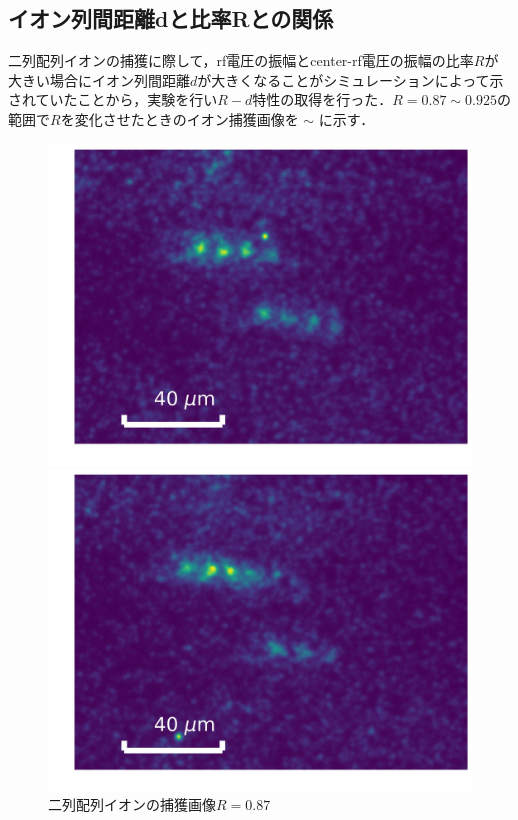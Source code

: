 \subsection{イオン列間距離dと比率Rとの関係}\label{quantity_3}
二列配列イオンの捕獲に際して，rf電圧の振幅とcenter-rf電圧の振幅の比率$R$が大きい場合にイオン列間距離$d$が大きくなることがシミュレーションによって示されていたことから，実験を行い$R-d$特性の取得を行った．$R = 0.87 \sim 0.925$の範囲で$R$を変化させたときのイオン捕獲画像を $\sim$ に示す．
\begin{figure}[h]
	\begin{minipage}{0.33\linewidth}
		\begin{center}
			\includegraphics[width = 0.8\columnwidth]{./results/figure/2D_087.jpg}
			\caption{二列配列イオンの捕獲画像$R = 0.87$}
			\label{fig:2D_087}
		\end{center}
	\end{minipage}
	\begin{minipage}{0.33\linewidth}
		\begin{center}
			\includegraphics[width = 0.8\columnwidth]{./results/figure/2D_088_0.jpg}

\end{center}
\end{minipage}
\end{figure}
